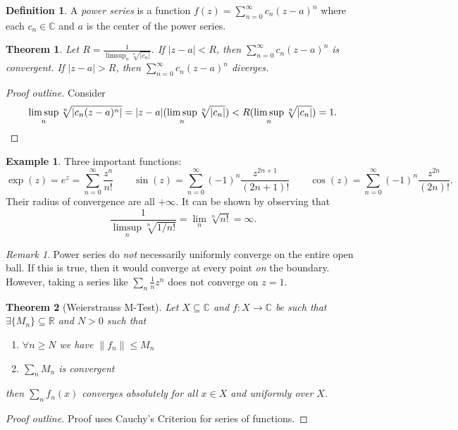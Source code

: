 \documentclass[letterpaper,12pt]{article}
\theoremstyle{definition}
\newtheorem{definition}{Definition}[section]
\newtheorem{example}{Example}[section]
\theoremstyle{plain}
\newtheorem{thm}{Theorem}[section]
\theoremstyle{remark}
\newtheorem*{remark}{Remark}
\begin{document}
\begin{definition}
A \emph{power series} is a function $f(z) = \sum_{n=0}^\infty c_n(z-a)^n$ where each $c_n\in \mathbb{C}$ and $a$ is the center of the power series.
\end{definition}

\begin{thm}
Let $R = \frac{1}{\limsup_n\sqrt[n]{|c_n|}}$. If $|z-a|<R$, then $\sum_{n=0}^\infty c_n(z-a)^n$ is convergent. If $|z-a|>R$, then $\sum_{n=0}^\infty c_n(z-a)^n$ diverges.
\end{thm}

\begin{proof}[Proof outline]
Consider
\[\limsup_n \sqrt[n]{|c_n(z-a)^n|} = |z-a|(\limsup_n\sqrt[n]{|c_n|}) < R (\limsup_n\sqrt[n]{|c_n|}) = 1.\qedhere\]
\end{proof}

\begin{example}
Three important functions:
\[\exp(z) = e^z = \sum_{n=0}^\infty \frac{z^n}{n!}\qquad \sin(z) = \sum_{n=0}^\infty (-1)^n \frac{z^{2n+1}}{(2n+1)!}\qquad \cos(z) = \sum_{n=0}^\infty (-1)^n \frac{z^{2n}}{(2n)!}.\]
Their radius of convergence are all $+\infty$. It can be shown by observing that
\[\frac{1}{\limsup_n \sqrt[n]{1/n!}} = \lim_n \sqrt[n]{n!} = \infty.\]
\end{example}

\begin{remark}
Power series do \emph{not} necessarily uniformly converge on the entire open ball. If this is true, then it would converge at every point \emph{on} the boundary. However, taking a series like $\sum_n \frac1n z^n$ does not converge on $z=1$.
\end{remark}

\begin{thm}[Weierstrauss M-Test]
Let $X\subseteq \mathbb{C}$ and $f:X\to \mathbb{C}$ be such that $\exists \{M_n\}\subseteq \mathbb{R}$ and $N>0$ such that
\begin{enumerate}
	\item $\forall n\geq N$ we have $\|f_n\|\leq M_n$
	\item $\sum_n M_n$ is convergent
\end{enumerate}
then $\sum_n f_n(x)$ converges absolutely for all $x\in X$ and uniformly over $X$.
\end{thm}

\begin{proof}[Proof outline]
Proof uses Cauchy's Criterion for series of functions.
\end{proof}
\end{document}

